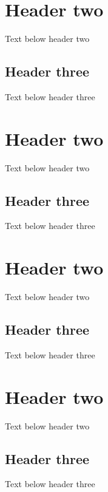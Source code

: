 \documentclass[a4paper,10pt,icelandic]{sphinxmanual}
\begin{document}
\section{Header two}
\label{\detokenize{inngangur-ad-fjarmalum/index:id1}}
\sphinxAtStartPar
Text below header two


\subsection{Header three}
\label{\detokenize{inngangur-ad-fjarmalum/index:id2}}
\sphinxAtStartPar
Text below header three


\section{Header two}
\label{\detokenize{inngangur-ad-fjarmalum/index:id3}}
\sphinxAtStartPar
Text below header two


\subsection{Header three}
\label{\detokenize{inngangur-ad-fjarmalum/index:id4}}
\sphinxAtStartPar
Text below header three


\section{Header two}
\label{\detokenize{inngangur-ad-fjarmalum/index:id5}}
\sphinxAtStartPar
Text below header two


\subsection{Header three}
\label{\detokenize{inngangur-ad-fjarmalum/index:id6}}
\sphinxAtStartPar
Text below header three


\section{Header two}
\label{\detokenize{inngangur-ad-fjarmalum/index:id7}}
\sphinxAtStartPar
Text below header two


\subsection{Header three}
\label{\detokenize{inngangur-ad-fjarmalum/index:id8}}
\sphinxAtStartPar
Text below header three

\sphinxstepscope
\end{document}
